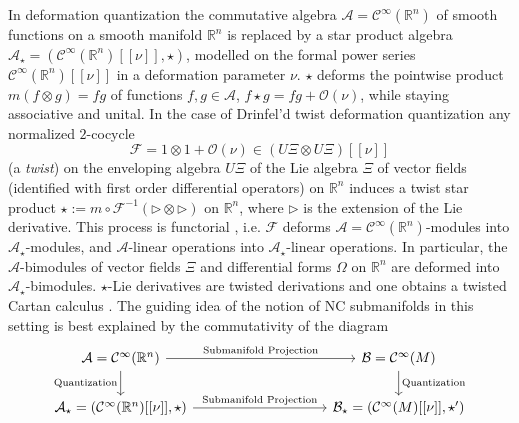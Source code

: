 \documentclass[a4paper,11pt]{article}
\begin{document}
In deformation quantization \cite{BayFlaFroLicSte} the commutative algebra
$\mathcal{A}=\mathcal{C}^\infty(\mathbb{R}^n)$ of smooth functions on a smooth manifold
$\mathbb{R}^n$ is replaced by a star product algebra $\mathcal{A}_\star=
(\mathcal{C}^\infty(\mathbb{R}^n)[[\nu]],\star)$, modelled on the formal power series 
$\mathcal{C}^\infty(\mathbb{R}^n)[[\nu]]$ in a deformation parameter $\nu$.  $\star$  deforms the pointwise
product $m(f\otimes g)=fg$ of functions $f,g\in\mathcal{A}$, %
$f\star g=fg+\mathcal{O}(\nu)$, while staying 
associative and unital.
In the case of Drinfel'd twist deformation quantization \cite{Aschieri2006,Drinfeld1983}
any  normalized $2$-cocycle
\begin{equation}
\label{twist}
    \mathcal{F}=1\otimes 1+\mathcal{O}(\nu)\in(U\Xi\otimes U\Xi)[[\nu]]
\end{equation}
(a {\it twist}) on the enveloping algebra $U\Xi$ of the Lie algebra $\Xi$ of vector fields
(identified with first order differential operators)  on $\mathbb{R}^n$
induces a twist star product $\star:=m\circ\mathcal{F}^{-1}(\rhd\otimes\rhd)$ on $\mathbb{R}^n$,
where $\rhd$ is the extension of the Lie derivative. 
This process is functorial  \cite{HenSte2000}, i.e. $\mathcal{F}$ deforms 
$\mathcal{A}=\mathcal{C}^\infty(\mathbb{R}^n)$-modules into $\mathcal{A}_\star$-modules,
and  $\mathcal{A}$-linear operations into $\mathcal{A}_\star$-linear operations.
In particular, the $\mathcal{A}$-bimodules of vector fields $\Xi$ and differential forms $\Omega$ on $\mathbb{R}^n$ are
deformed into $\mathcal{A}_\star$-bimodules.  $\star$-Lie derivatives
are twisted derivations and one  obtains a twisted Cartan calculus \cite{Aschieri2006}.
The guiding idea of the notion of NC submanifolds in this setting is best
explained by the commutativity of the  diagram
\begin{equation}\label{Diag}
\begin{tikzcd}
\mathcal{A}=\mathcal{C}^\infty(\mathbb{R}^n)
\arrow{rrrr}{\text{Submanifold Projection}}
\arrow{d}[swap]{\text{Quantization}}
& & & &\mathcal{B}=\mathcal{C}^\infty(M)
\arrow{d}{\text{Quantization}}\\
\mathcal{A}_\star=(\mathcal{C}^\infty(\mathbb{R}^n)[[\nu]],\star)
\arrow{rrrr}{\text{Submanifold Projection}}
& & & &\mathcal{B}_\star=(\mathcal{C}^\infty(M)[[\nu]],\star')
\end{tikzcd}
\end{equation}
\end{document}
